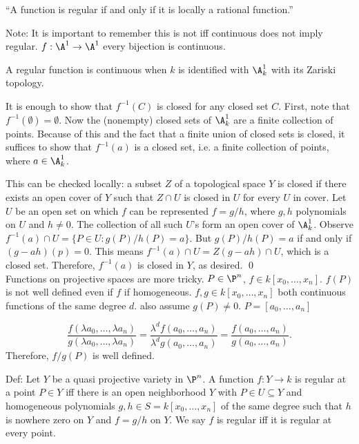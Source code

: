 ``A function is regular if and only if it is locally a rational function.''

Note: It is important to remember this is not iff continuous does not imply regular. $f: \A^1 \to \A^1$ every bijection is continuous. 








\begin{lem}
A regular function is continuous when $k$ is identified with $\A^1_k$ with its Zariski topology. 
\end{lem}

\pf It is enough to show that $f^{-1}(C)$ is closed for any closed set $C$. First, note that $f^{-1}(\emptyset)= \emptyset$. Now the (nonempty) closed sets of $\A_k^1$ are a finite collection of points. Because of this and the fact that a finite union of closed sets is closed, it suffices to show that $f^{-1}(a)$ is a closed set, i.e. a finite collection of points, where $a \in \A_k^1$. 

This can be checked locally: a subset $Z$ of a topological space $Y$ is closed if there exists an open cover of $Y$ such that $Z \cap U$ is closed in $U$ for every $U$ in cover. Let $U$ be an open set on which $f$ can be represented $f= g/h$, where $g, h$ polynomials on $U$ and $h \neq 0$. The collection of all such $U$'s form an open cover of $\A_k^1$. Observe $f^{-1}(a) \cap U= \{ P \in U \colon g(P)/h(P)= a\}$. But $g(P) / h(P)= a$ if and only if $(g - ah)(p)= 0$. This means $f^{-1}(a) \cap U= Z(g - ah) \cap U$, which is a closed set. Therefore, $f^{-1}(a)$ is closed in $Y$, as desired. \qed \\








Functions on projective spaces are more tricky. $P \in \P^n$, $f \in k[x_0,\ldots,x_n]$. $f(P)$ is not well defined even if $f$ if homogeneous. $f,g \in k[x_0,\ldots,x_n]$ both continuous functions of the same degree $d$. also assume $g(P) \neq 0$. $P= [a_0,\ldots,a_n]$

	\[
	\dfrac{f(\lambda a_0,\ldots,\lambda a_n)}{g(\lambda a_0,\ldots,\lambda a_n)}= \dfrac{\lambda^d f(a_0,\ldots,a_n)}{\lambda^d g(a_0,\ldots,a_n)}= \dfrac{f(a_0,\ldots,a_n)}{g(a_0,\ldots,a_n)}.
	\]
Therefore, $f/g(P)$ is well defined. 


Def: Let $Y$ be a quasi projective variety in $\P^n$. A function $f: Y \to k$ is regular at a point $P \in Y$ iff there is an open neighborhood $Y$ with $P \in U \subseteq Y$ and homogeneous polynomials $g,h \in S= k[x_0,\ldots,x_n]$ of the same degree such that $h$ is nowhere zero on  $Y$ and $f=g/h$ on $Y$. We say $f$ is regular iff it is regular at every point. 


